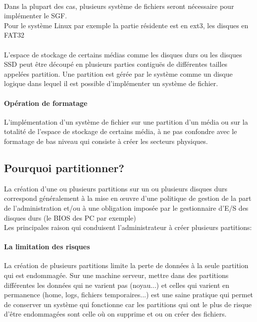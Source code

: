 \documentclass[12pt,a4paper,openany]{book}
\begin{document}
			\paragraph{}
			Dans la plupart des cas, plusieurs système de fichiers seront nécessaire
			pour implémenter le SGF. \\
			Pour le système Linux par exemple la partie résidente est en ext3, les disques
			en FAT32
			\paragraph{}
			L'espace de stockage de certains médias comme les disques durs ou les 
			disques SSD peut être découpé en plusieurs parties contiguës de 
			différentes tailles appelées partition. Une partition est gérée par 
			le système comme un disque logique dans lequel il est possible 
			d'implémenter un système de fichier. 
			\paragraph{Opération de formatage}
			L'implémentation d'un système de fichier sur une partition d'un média 
			ou sur la totalité de l'espace de stockage de certains média, à ne 
			pas confondre avec le formatage de bas niveau qui consiste à créer 
			les secteurs physiques.
			\subsection{Pourquoi partitionner?}
				La création d'une ou plusieurs partitions sur un ou plusieurs 
				disques durs correspond généralement à la mise en œuvre d'une
				politique de gestion de la part de l'administration et/ou à une
				obligation imposée par le gestionnaire d'E/S des disques durs 
				(le BIOS des PC par exemple)\\
				Les principales raison qui conduisent l'administrateur à créer
				 plusieurs partitions: 
			 \paragraph{La limitation des risques}
				La création de plusieurs partitions limite la perte de données à 
				la seule partition qui est endommagée. Sur une machine serveur,
				mettre dans des partitions différentes les données qui ne varient
				pas (noyau...) et celles qui varient en permanence (home, logs, 
						fichiers temporaires...) est une saine pratique qui 
				permet de conserver un système qui fonctionne car les partitions 
				qui ont le plus de risque d'être endommagées sont celle où on 
				supprime et ou on créer des fichiers. 
\end{document}
